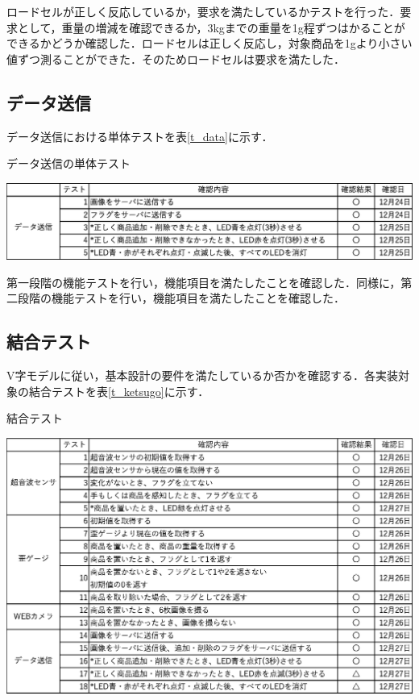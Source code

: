 ロードセルが正しく反応しているか，要求を満たしているかテストを行った．要求として，重量の増減を確認できるか，3kgまでの重量を1g程ずつはかることができるかどうか確認した．ロードセルは正しく反応し，対象商品を1gより小さい値ずつ測ることができた．そのためロードセルは要求を満たした．


\subsection*{データ送信}

データ送信における単体テストを表\ref{t_data}に示す．


\begin{table}[htbp]
\centering
\caption{データ送信の単体テスト}
\includegraphics[width = 15cm]{./picture/tantai_data.eps}
\label{t_data}
\end{table}

第一段階の機能テストを行い，機能項目を満たしたことを確認した．同様に，第二段階の機能テストを行い，機能項目を満たしたことを確認した．


\subsection{結合テスト}


V字モデルに従い，基本設計の要件を満たしているか否かを確認する．各実装対象の結合テストを表\ref{t_ketsugo}に示す．


\begin{table}[htbp]
\centering
\caption{結合テスト}
\includegraphics[width = 15cm]{./picture/t_ketsugo.eps}
\label{t_ketsugo}
\end{table}

